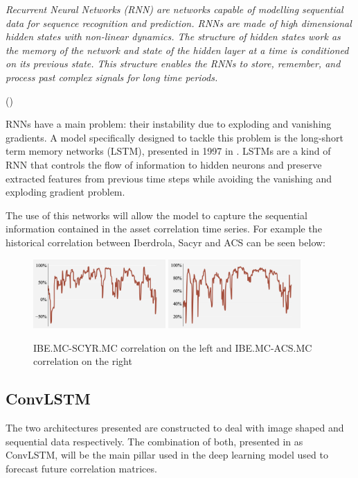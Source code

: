 \documentclass{article}
\begin{document}
\textit{Recurrent Neural Networks (RNN) are networks capable of modelling sequential data for sequence recognition and prediction. RNNs are made of high dimensional hidden states with non-linear dynamics. The structure of hidden states work as the memory of the network and state of the hidden layer at a time is conditioned on its previous state. This structure enables the RNNs to store, remember, and process past complex signals for long time periods.}
\begin{flushright}\small
(\cite{salehinejad2017recent})
\end{flushright}

RNNs have a main problem: their instability due to exploding and vanishing gradients. A model specifically designed to tackle this problem is the long-short term memory networks (LSTM), presented in 1997 in \cite{hochreiter1997long}. LSTMs are a kind of RNN that controls the flow of information to hidden neurons and preserve extracted features from previous time steps while avoiding the vanishing and exploding gradient problem.



The use of this networks will allow the model to capture the sequential information contained in the asset correlation time series. For example the historical correlation between Iberdrola, Sacyr and ACS can be seen below:

\begin{figure}[H]
    \centering
{{\includegraphics[width=0.45\textwidth]{Plots/corr31.png} }}%
    \qquad
{{\includegraphics[width=0.45\textwidth]{Plots/corr32.png} }}%
    \caption{IBE.MC-SCYR.MC correlation on the left and IBE.MC-ACS.MC correlation on the right}%
\end{figure}

\subsection{ConvLSTM}
The two architectures presented are constructed to deal with image shaped and sequential data respectively. The combination of both, presented in \cite{shi2015convolutional} as ConvLSTM, will be the main pillar used in the deep learning model used to forecast future correlation matrices.
\end{document}
